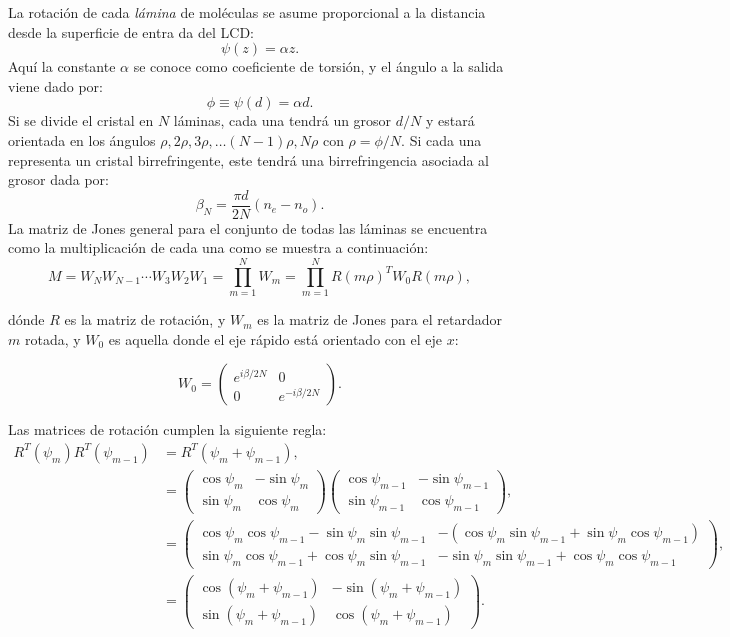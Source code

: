 La rotación de cada \textit{lámina} de
moléculas se asume proporcional a la distancia desde la superficie de
entra da del LCD:
\begin{equation}
  \label{eq:twist_angle}
\psi(z)  =\alpha z.  
\end{equation}
Aquí la constante $\alpha$
se conoce como coeficiente de torsión, y el ángulo a la salida viene
dado por: $$\phi \equiv \psi(d)=\alpha d.$$ Si se divide el cristal en
$N$ láminas, cada una tendrá un grosor $d/N$ y estará orientada en los ángulos
$\rho,2\rho,3\rho,\dots\left(N-1\right)\rho,N\rho$ con
$\rho=\phi/N$. Si cada una representa un cristal birrefringente, este tendrá una
birrefringencia asociada al grosor dada por: $$\beta_N = \frac{\pi
  d}{2N}\left(n_e-n_o\right).$$
La matriz de Jones general para el conjunto de todas las láminas se
encuentra como la multiplicación de cada una como se muestra a
continuación:
\[ M= W_NW_{N-1}\cdots W_3W_2W_1=\prod_{m=1}^NW_m = \prod_{m=1}^NR(m\rho)^TW_0R(m\rho), \]

dónde $R$ es la matriz de rotación, y $W_m$ es la matriz de Jones para
el retardador $m$ rotada, y $W_0$ es aquella donde el eje rápido está
orientado con el eje $x$:

\begin{equation*}
W_0 =
\begin{pmatrix}
  e^{i\beta/2N} &0 \\ 0 & e^{-i\beta/2N} 
\end{pmatrix}.
\end{equation*}

Las matrices de rotación cumplen la siguiente regla:
\begin{align*}
R^T(\psi_m)R^T(\psi_{m-1}) &= R^T\left(\psi_m+\psi_{m-1}\right),\\
&=
\begin{pmatrix}
  \cos{\psi_m}&  -\sin{\psi_m}\\  \sin{\psi_m}&  \cos{\psi_m}
\end{pmatrix}
\begin{pmatrix}
  \cos{\psi_{m-1}}&  -\sin{\psi_{m-1}}\\  \sin{\psi_{m-1}}&  \cos{\psi_{m-1}}
\end{pmatrix},\\
&=
\begin{pmatrix}
  \cos{\psi_m}\cos{\psi_{m-1}}-\sin{\psi_m}\sin{\psi_{m-1}}&  
-(\cos{\psi_m}\sin{\psi_{m-1}}+\sin{\psi_m} \cos{\psi_{m-1}})\\
  \sin{\psi_m} \cos{\psi_{m-1}}+\cos{\psi_m}\sin{\psi_{m-1}}& 
 -\sin{\psi_m}\sin{\psi_{m-1}}+\cos{\psi_m}\cos{\psi_{m-1}}
\end{pmatrix},  \\
&=\begin{pmatrix}
  \cos{\left(\psi_m+\psi_{m-1}\right)}&  -\sin{\left(\psi_m+\psi_{m-1}\right)}\\
  \sin{\left(\psi_m+\psi_{m-1}\right)}&  \cos{\left(\psi_m+\psi_{m-1}\right)} 
\end{pmatrix}.
\end{align*}

